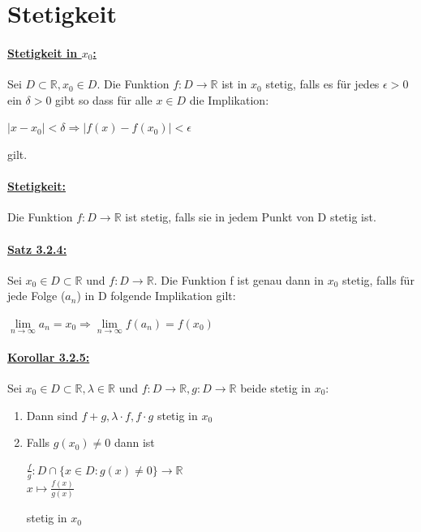 \documentclass[8pt]{extreport}
\begin{document}
\section{Stetigkeit}
\paragraph{\underline{Stetigkeit in $x_0$:}} Sei $D \subset \mathbb{R}, x_0 \in D$. Die Funktion $f: D \rightarrow \mathbb{R}$ ist in $x_0$ stetig, falls es für jedes $\epsilon > 0$ ein $\delta > 0$ gibt so dass für alle $x \in D$ die Implikation:
\begin{center}
$|x-x_0| < \delta \Rightarrow |f(x) -f(x_0)| < \epsilon$
\end{center}
gilt.
\paragraph{\underline{Stetigkeit:}} Die Funktion $ f: D \rightarrow \mathbb{R}$ ist stetig, falls sie in jedem Punkt von D stetig ist.
\paragraph{\underline{Satz 3.2.4:}} Sei $x_0 \in D \subset \mathbb{R}$ und $ f: D \rightarrow \mathbb{R}$. Die Funktion f ist genau dann in $x_0$ stetig, falls für jede Folge ($a_n$) in D folgende Implikation gilt:
\begin{center}
$\lim\limits_{n \to \infty} a_n = x_0 \Rightarrow \lim\limits_{n \to \infty} f(a_n) = f(x_0)$
\end{center}
\paragraph{\underline{Korollar 3.2.5:}} Sei $x_0 \in D \subset \mathbb{R}, \lambda \in \mathbb{R}$ und $f:D \rightarrow \mathbb{R}, g: D \rightarrow \mathbb{R}$ beide stetig in $x_0$:
\begin{enumerate}
\item Dann sind $f + g, \lambda \cdot f, f\cdot g$ stetig in $x_0$
\item Falls $g(x_0) \neq 0$ dann ist 
\begin{center}
$\frac{f}{g} : D \cap \{x \in D : g(x) \neq 0\} \rightarrow \mathbb{R}$\\
$x \mapsto \frac{f(x)}{g(x)}$
\end{center}
stetig in $x_0$
\end{enumerate}
\end{document}
